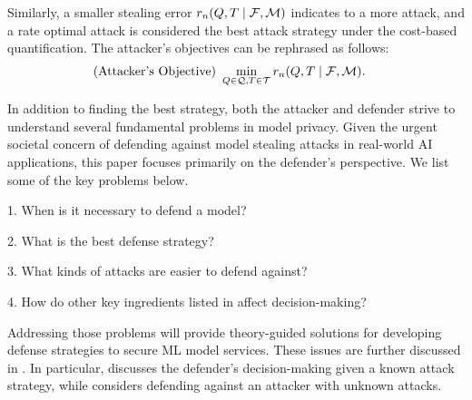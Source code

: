         Similarly, a smaller stealing error $r_n(Q,T \mid \mathcal{F},\mathcal{M})$ indicates to a more \eco attack, and a rate optimal attack is considered
        the best attack strategy under the cost-based quantification.
        The attacker's objectives can be rephrased as follows: 
        \begin{align*}
            \text{(Attacker's Objective) } &\min_{Q \in \mathcal{Q}, T \in \mathcal{T}}  r_n(Q, T \mid \mathcal{F},\mathcal{M}).
        \end{align*}
        
        In addition to finding the best strategy, both the attacker and defender strive to understand several fundamental problems in model privacy.
        Given the urgent societal concern of defending against model stealing attacks in real-world AI applications, this paper focuses primarily on the defender's perspective. We list some of the key problems below. 

        1. When is it necessary to defend a model?

        2. What is the best defense strategy?

        3. What kinds of attacks are easier to defend against?

        4. How do other key ingredients listed in  affect decision-making?
        
        Addressing those problems will provide theory-guided solutions for developing \eco defense strategies to secure ML model services. These issues are further discussed in . In particular,  discusses the defender's decision-making given a known attack strategy, while  considers defending against an attacker with unknown attacks.
        
        
